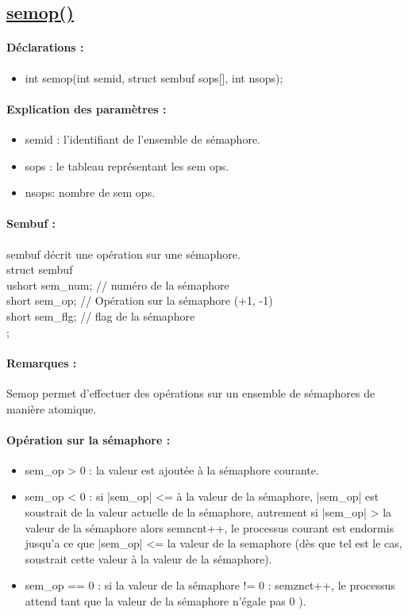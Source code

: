 \documentclass{article}[12pt]
\begin{document}
\subsection{\href{http://jp.barralis.com/linux-man/man2/semop.2.php}{semop()}}
\paragraph{Déclarations : }
\begin{itemize}
	\item int semop(int semid, struct sembuf sops[], int nsops);
\end{itemize}
\paragraph{Explication des paramètres : }
\begin{itemize}
\item semid : l'identifiant de l'ensemble de sémaphore.
\item sops : le tableau représentant les sem ops. 
\item nsops: nombre de sem ops. 
\end{itemize}
\paragraph{Sembuf : } sembuf décrit une opération sur une sémaphore.\\
struct sembuf {\\
ushort sem\_num; // numéro de la sémaphore\\
short sem\_op; // Opération sur la sémaphore (+1, -1)\\
short sem\_flg; // flag de la sémaphore \\
}; 
\paragraph{Remarques : } Semop permet d'effectuer des opérations sur un ensemble de sémaphores de manière atomique. 
\paragraph{Opération sur la sémaphore : }
\begin{itemize}
\item sem\_op > 0 : la valeur est ajoutée à la sémaphore courante.
\item sem\_op < 0 : si |sem\_op| <= à la valeur de la sémaphore, |sem\_op| est soustrait de la valeur actuelle de la sémaphore, autrement si |sem\_op| > la valeur de la sémaphore alors semncnt++, le processus courant est endormis jusqu'a ce que |sem\_op| <= la valeur de la semaphore (dès que tel est le cas, soustrait cette valeur à la valeur de la sémaphore).
\item sem\_op == 0 : si la valeur de la sémaphore != 0 : semznct++, le processus attend tant que la valeur de la sémaphore n’égale pas 0 ).
\end{itemize}
\end{document}
